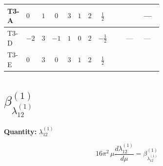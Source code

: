 \documentclass[8pt]{article}
\begin{document}
\begin{landscape}
\begin{longtable}{@{}llcccccc >{\raggedright\arraybackslash}p{0.21\linewidth} >{\raggedright\arraybackslash}p{0.21\linewidth} >{\raggedright\arraybackslash}p{0.21\linewidth}@{}}
\midrule
T3-A & $0$ & $1$ & $0$ & $3$ & $1$ & $2$ & $\frac{1}{2}$ & \scriptsize\adjustbox{max width=\linewidth}{$\begin{gathered} -\frac{15 {g_1}^2 {\lambda_{HS_2}^{(1)}}}{2}\end{gathered}$} & \scriptsize\adjustbox{max width=\linewidth}{$\begin{gathered} +6 {\lambda_{HS_2}^{(A)}}^2\end{gathered}$} & --- \\
\midrule
T3-D & $-2$ & $3$ & $-1$ & $1$ & $0$ & $2$ & $-\frac{1}{2}$ & \scriptsize\adjustbox{max width=\linewidth}{$\begin{gathered} -\frac{3 {g_1}^2 {\lambda_{HS_2}^{(1)}}}{2}\end{gathered}$} & --- & --- \\
\midrule
T3-E & $0$ & $3$ & $0$ & $3$ & $1$ & $2$ & $\frac{1}{2}$ & \scriptsize\adjustbox{max width=\linewidth}{$\begin{gathered} -\frac{15 {g_1}^2 {\lambda_{HS_2}^{(1)}}}{2}\end{gathered}$} & \scriptsize\adjustbox{max width=\linewidth}{$\begin{gathered} +6 {\lambda_{HS_2}^{(A)}}^2\end{gathered}$} & \scriptsize\adjustbox{max width=\linewidth}{$\begin{gathered} +{\lambda_{HS_1}^{(1)}} (6 {\lambda_{12}^{(1)}}+4 {\lambda_{12}^{(\times)}})\end{gathered}$} \\
\midrule
\bottomrule
\end{longtable}
\clearpage
\section*{$\beta_{\lambda_{12}^{(1)}}^{(1)}$}
\noindent\textbf{Quantity: }$\lambda_{12}^{(1)}$\par\smallskip
\[16\pi^2\,\mu\frac{d \lambda_{12}^{(1)}}{d\mu}=\beta_{\lambda_{12}^{(1)}}^{(1)}\]

\end{landscape}
\end{document}

